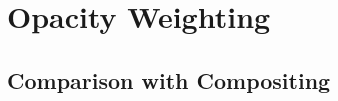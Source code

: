
    
\section{Opacity Weighting}\label{sec:opacity}

\subsection{Comparison with Compositing}\label{subsec:opacity_compare}
